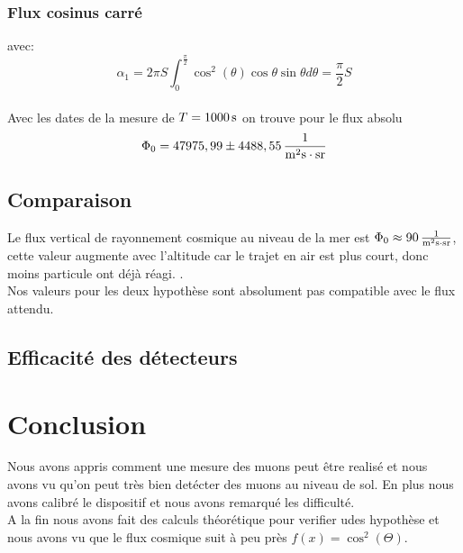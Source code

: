 \documentclass[a4paper,11pt,liststotocnumbered,bibtotocnumbered]{scrartcl}
\begin{document}
    

   \subsubsection{Flux cosinus carré}
avec:\\
\begin{equation*}
\alpha_1=2\pi S\int_0^{\frac{\pi}{2}}\cos^2(\theta)\cos\theta \sin\theta d \theta=\frac{\pi}{2} S
\end{equation*}\\
Avec les dates de la mesure de $T=\unit[1000]{s}$ on trouve pour le flux absolu
    \begin{equation*}
     \Phi_0=\unit[47975,99\pm4488,55]{\frac{1}{m^2s\cdot sr}} 
    \end{equation*}

   
   \subsection{Comparaison}
    Le flux vertical de rayonnement cosmique au niveau de la mer est $\Phi_0\approx\unit[90]{\frac{1}{m^2s\cdot sr}} $, cette valeur augmente avec l'altitude car le trajet en air est plus court, donc moins particule ont déjà réagi. .\\
    Nos valeurs pour les deux hypothèse sont absolument pas compatible avec le flux attendu.

   \subsection{Efficacité des détecteurs}





 \section{Conclusion}
  Nous avons appris comment une mesure des muons peut être realisé et nous avons vu qu'on peut très bien detécter des muons au niveau de sol. En plus nous avons calibré le dispositif et nous avons remarqué les difficulté. \\
  A la fin nous avons fait des calculs théorétique pour verifier udes hypothèse et nous avons vu que le flux cosmique suit à peu près $f(x)=\cos^2(\Theta)$.
 
 
 \begin{appendix}
  
    

  \listoffigures  
 \end{appendix}
\end{document}
